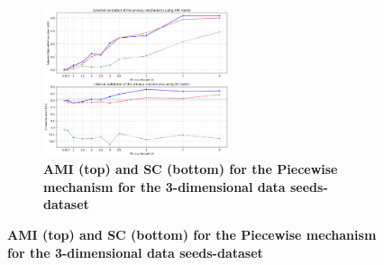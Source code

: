 \begin{figure}[H]
    \begin{subfigure}{1\textwidth}
        \centering
        \includegraphics[width=0.60\textwidth]{Results/kd-laplace/piecewise/seeds-dataset/ami-and-sc_3_dimensions.png}
        \caption{\textbf{AMI (top) and SC (bottom) for the Piecewise mechanism for the 3-dimensional data seeds-dataset}}
    \end{subfigure}
    \label{fig:validation-seeds-dataset_comparison_3d-laplace}
\end{figure}

